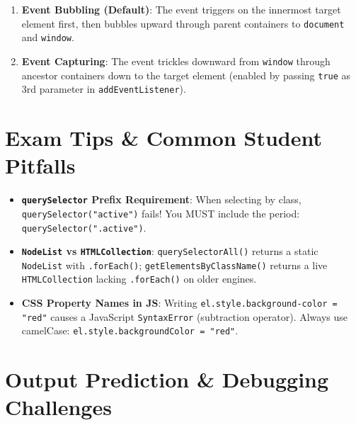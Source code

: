 \begin{enumerate}[leftmargin=1.5em]
    \item \textbf{Event Bubbling (Default)}: The event triggers on the innermost target element first, then bubbles upward through parent containers to \texttt{document} and \texttt{window}.
    \item \textbf{Event Capturing}: The event trickles downward from \texttt{window} through ancestor containers down to the target element (enabled by passing \texttt{true} as 3rd parameter in \texttt{addEventListener}).
\end{enumerate}

\section{Exam Tips \& Common Student Pitfalls}

\begin{examtip}
\begin{itemize}[leftmargin=1.5em]
    \item \textbf{\texttt{querySelector} Prefix Requirement}: When selecting by class, \texttt{querySelector("active")} fails! You MUST include the period: \texttt{querySelector(".active")}.
    \item \textbf{\texttt{NodeList} vs \texttt{HTMLCollection}}: \texttt{querySelectorAll()} returns a static \texttt{NodeList} with \texttt{.forEach()}; \texttt{getElementsByClassName()} returns a live \texttt{HTMLCollection} lacking \texttt{.forEach()} on older engines.
    \item \textbf{CSS Property Names in JS}: Writing \texttt{el.style.background-color = "red"} causes a JavaScript \texttt{SyntaxError} (subtraction operator). Always use camelCase: \texttt{el.style.backgroundColor = "red"}.
\end{itemize}
\end{examtip}

\section{Output Prediction \& Debugging Challenges}

